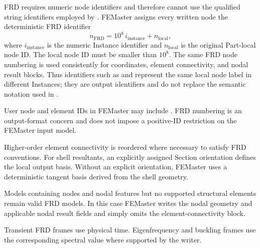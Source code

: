 FRD requires numeric node identifiers and therefore cannot use the qualified string identifiers employed by . FEMaster assigns every written node the deterministic FRD identifier
\[
n_{\mathrm{FRD}} = 10^8\,i_{\mathrm{instance}} + n_{\mathrm{local}},
\]
where \(i_{\mathrm{instance}}\) is the numeric Instance identifier and \(n_{\mathrm{local}}\) is the original Part-local node ID. The local node ID must be smaller than \(10^8\). The same FRD node numbering is used consistently for coordinates, element connectivity, and nodal result blocks. Thus identifiers such as  and  represent the same local node label in different Instances; they are output identifiers and do not replace the semantic  notation used in .

User node and element IDs in FEMaster may include . FRD numbering is an output-format concern and does not impose a positive-ID restriction on the FEMaster input model.

Higher-order element connectivity is reordered where necessary to satisfy FRD conventions. For shell resultants, an explicitly assigned Section orientation defines the local output basis. Without an explicit orientation, FEMaster uses a deterministic tangent basis derived from the shell geometry.

Models containing nodes and nodal features but no supported structural elements remain valid FRD models. In this case FEMaster writes the nodal geometry and applicable nodal result fields and simply omits the element-connectivity block.

Transient FRD frames use physical time. Eigenfrequency and buckling frames use the corresponding spectral value where supported by the writer.
